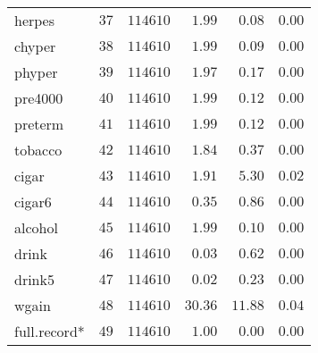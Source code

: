 \begin{table}[!tbp]
\begin{center}
\begin{tabular}{lrrrrr}
herpes&$37$&$114610$&$   1.99$&$  0.08$&$0.00$\tabularnewline
chyper&$38$&$114610$&$   1.99$&$  0.09$&$0.00$\tabularnewline
phyper&$39$&$114610$&$   1.97$&$  0.17$&$0.00$\tabularnewline
pre4000&$40$&$114610$&$   1.99$&$  0.12$&$0.00$\tabularnewline
preterm&$41$&$114610$&$   1.99$&$  0.12$&$0.00$\tabularnewline
tobacco&$42$&$114610$&$   1.84$&$  0.37$&$0.00$\tabularnewline
cigar&$43$&$114610$&$   1.91$&$  5.30$&$0.02$\tabularnewline
cigar6&$44$&$114610$&$   0.35$&$  0.86$&$0.00$\tabularnewline
alcohol&$45$&$114610$&$   1.99$&$  0.10$&$0.00$\tabularnewline
drink&$46$&$114610$&$   0.03$&$  0.62$&$0.00$\tabularnewline
drink5&$47$&$114610$&$   0.02$&$  0.23$&$0.00$\tabularnewline
wgain&$48$&$114610$&$  30.36$&$ 11.88$&$0.04$\tabularnewline
full.record*&$49$&$114610$&$   1.00$&$  0.00$&$0.00$\tabularnewline
\hline
\end{tabular}
\end{center}
\end{table}

